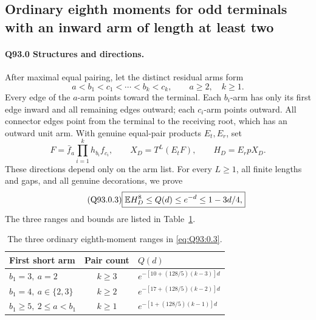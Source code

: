 \subsection{Ordinary eighth moments for odd terminals with an inward arm of length at least two}\label{proof:Q5-C093}

\paragraph{Q93.0 Structures and directions.}
After maximal equal pairing, let the distinct residual arms form
\begin{equation}\tag{Q93.0.1}\label{eq:Q93:0.1}
a<b_1<c_1<\cdots<b_k<c_k,\qquad a\ge2,\quad k\ge1.
\end{equation}
Every edge of the \(a\)-arm points toward the terminal. Each \(b_i\)-arm
has only its first edge inward and all remaining edges outward;
each \(c_i\)-arm points outward. All connector edges point from the
terminal to the receiving root, which has an outward unit arm. With
genuine equal-pair products \(E_t,E_r\), set
\begin{equation}\tag{Q93.0.2}\label{eq:Q93:0.2}
F=\bar f_a\prod_{i=1}^kh_{b_i}f_{c_i},\qquad
X_D=T^L(E_tF),\qquad H_D=E_rpX_D.
\end{equation}
These directions depend only on the arm list. For every \(L\ge1\),
all finite lengths and gaps, and all genuine decorations, we prove
\begin{equation}\tag{Q93.0.3}\label{eq:Q93:0.3}
\boxed{\mathbb E H_D^8\le Q(d)\le e^{-d}\le1-3d/4,}
\end{equation}
The three ranges and bounds are listed in Table~\ref{tab:oc:q93-ranges}.
\begin{table}[htbp]
\centering\small
\setlength{\tabcolsep}{5pt}
\caption{The three ordinary eighth-moment ranges in \eqref{eq:Q93:0.3}.}\label{tab:oc:q93-ranges}
\begin{tabular}{lcl}
\toprule
First short arm & Pair count & $Q(d)$\\
\midrule
$b_1=3,\ a=2$ & $k\ge3$ & $e^{-[10+(128/5)(k-3)]d}$\\
$b_1=4,\ a\in\{2,3\}$ & $k\ge2$ & $e^{-[17+(128/5)(k-2)]d}$\\
$b_1\ge5,\ 2\le a<b_1$ & $k\ge1$ & $e^{-[1+(128/5)(k-1)]d}$\\
\bottomrule
\end{tabular}
\end{table}


